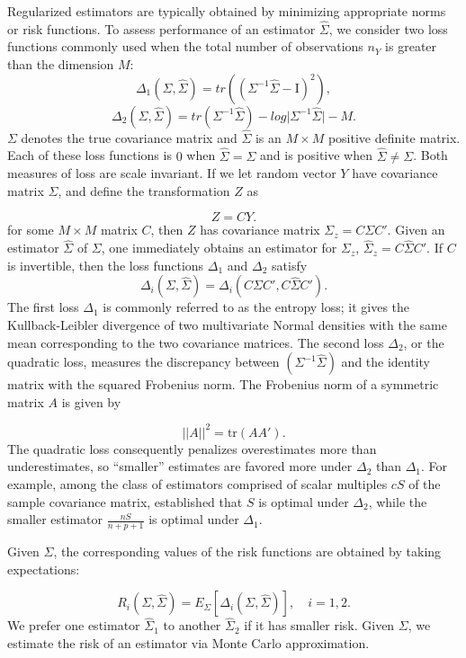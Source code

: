 Regularized estimators are typically obtained by minimizing appropriate norms or risk functions. To assess performance of an estimator $\hat{\Sigma}$, we consider two loss functions commonly used when the total number of observations $n_Y$ is greater than the dimension $M$:
\begin{equation} \label{eq:quad-loss}
\Delta_1\left(\Sigma,\hat{\Sigma} \right) = tr\left(\left( \Sigma^{-1} \hat{\Sigma} - \mathrm{I}\right)^2 \right),
\end{equation}
\noindent
\begin{equation} \label{eq:entropy-loss}
\Delta_2\left(\Sigma,\hat{\Sigma}\right) = tr\left( \Sigma^{-1} \hat{\Sigma} \right) - log \vert \Sigma^{-1} \hat{\Sigma} \vert - M.
\end{equation}
\noindent
$\Sigma$ denotes the true covariance matrix and $\hat{\Sigma}$ is an $M \times M$ positive definite matrix. Each of these loss functions is $0$ when $\hat{\Sigma} = \Sigma$ and is positive when $\hat{\Sigma} \ne \Sigma$. Both measures of loss are scale invariant. If we let random vector $Y$ have covariance matrix $\Sigma$, and define the transformation $Z$ as

\[
Z = CY. 
\]
\noindent
for some $M \times M$ matrix $C$,  then $Z$ has covariance matrix $\Sigma_z = C \Sigma C'$. Given an estimator $\hat{\Sigma}$ of $\Sigma$, one immediately obtains an estimator for $\Sigma_z$, $\hat{\Sigma}_z = C \hat{\Sigma} C'$. If $C$ is invertible, then the loss functions $\Delta_1$ and $\Delta_2$ satisfy
\[
\Delta_i\left(\Sigma,\hat{\Sigma}\right) = \Delta_i\left(C \Sigma C', C \hat{\Sigma}C' \right). 
\]
\noindent
The first loss $\Delta_1$ is commonly referred to as the entropy loss; it gives the Kullback-Leibler divergence of two multivariate Normal densities with the same mean corresponding to the two covariance matrices. The second loss $\Delta_2$, or the quadratic loss, measures the discrepancy between $\left(\Sigma^{-1} \hat{\Sigma}\right)$ and the identity matrix with the squared Frobenius norm. The Frobenius norm of a symmetric matrix $A$ is given by 

\[
\vert \vert A \vert \vert^2 = \mbox{tr}\left(A A'\right).
\]
\noindent
The quadratic loss consequently penalizes overestimates more than underestimates, so ``smaller'' estimates are favored more under $\Delta_2$ than $\Delta_1$. For example, among the class of estimators comprised of scalar multiples $cS$ of the sample covariance matrix, \citet{haff1980empirical} established that $S$ is optimal under $\Delta_2$, while the smaller estimator $\frac{nS}{n+p+1}$ is optimal under $\Delta_1$. 

\bigskip

Given $\Sigma$, the corresponding values of the risk functions are obtained by taking expectations:

\begin{equation*}
R_i \left(\Sigma,\hat{\Sigma}\right) = E_\Sigma\left[\Delta_i\left(\Sigma,\hat{\Sigma}\right)\right], \quad i = 1,2.
\end{equation*}
\noindent
We prefer one estimator $\hat{\Sigma}_1$ to another $\hat{\Sigma}_2$ if it has smaller risk.  Given $\Sigma$, we estimate the risk of an estimator via Monte Carlo approximation. 
